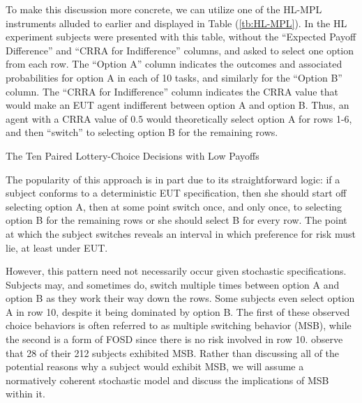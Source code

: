 \documentclass[../main.tex]{subfiles}
\begin{document}
To make this discussion more concrete, we can utilize one of the HL-MPL instruments alluded to earlier and displayed in Table (\ref{tb:HL-MPL}).
In the HL experiment subjects were presented with this table, without the \enquote{Expected Payoff Difference} and \enquote{CRRA for Indifference} columns, and asked to select one option from each row.
The \enquote{Option A} column indicates the outcomes and associated probabilities for option A in each of 10 tasks, and similarly for the \enquote{Option B} column.
The \enquote{CRRA for Indifference} column indicates the CRRA value that would make an EUT agent indifferent between option A and option B.
Thus, an agent with a CRRA value of $0.5$ would theoretically select option A for rows 1-6, and then \enquote{switch} to selecting option B for the remaining rows.

\begin{table}[ht]
	\centering
	\captionsetup{justification=centering}
	\caption{The Ten Paired Lottery-Choice Decisions with Low Payoffs \newline \textcite[1645]{Holt2002} }
	\label{tb:HL-MPL}
	\begin{adjustbox}{width=1\textwidth}
	\end{adjustbox}
\end{table}

The popularity of this approach is in part due to its straightforward logic:
if a subject conforms to a deterministic EUT specification, then she should start off selecting option A, then at some point switch once, and only once, to selecting option B for the remaining rows or she should select B for every row.
The point at which the subject switches reveals an interval in which preference for risk must lie, at least under EUT.

However, this pattern need not necessarily occur given stochastic specifications.
Subjects may, and sometimes do, switch multiple times between option A and option B as they work their way down the rows.
Some subjects even select option A in row 10, despite it being dominated by option B.
The first of these observed choice behaviors is often referred to as multiple switching behavior (MSB), while the second is a form of FOSD since there is no risk involved in row 10.
\textcite[1647]{Holt2002} observe that 28 of their 212 subjects exhibited MSB.
Rather than discussing all of the potential reasons why a subject would exhibit MSB, we will assume a normatively coherent stochastic model and discuss the implications of MSB within it.
\end{document}
